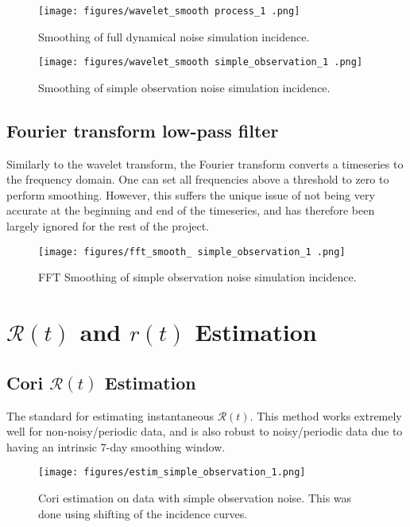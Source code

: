 \documentclass{article}
\newcommand{\nR}{\mathscr{R}}
\begin{document}
\clearpage
\begin{figure}[h!]
    \centering
    \texttt{[image: figures/wavelet\_smooth process\_1 .png]}
    \caption{Smoothing of full dynamical noise simulation incidence.}
\end{figure}

\clearpage
\begin{figure}[h!]
    \centering
    \texttt{[image: figures/wavelet\_smooth simple\_observation\_1 .png]}
    \caption{Smoothing of simple observation noise simulation incidence.}
\end{figure}



\subsection{Fourier transform low-pass filter}
Similarly to the wavelet transform, the Fourier transform converts a timeseries to the frequency domain. One can set all frequencies above a threshold to zero to perform smoothing. However, this suffers the unique issue of not being very accurate at the beginning and end of the timeseries, and has therefore been largely ignored for the rest of the project.

\clearpage
\begin{figure}[h!]
    \centering
    \texttt{[image: figures/fft\_smooth\_ simple\_observation\_1 .png]}
    \caption{FFT Smoothing of simple observation noise simulation incidence.}
\end{figure}

\section {$\nR(t)$ and $r(t)$ Estimation}
\subsection{Cori $\nR(t)$ Estimation}
The standard for estimating instantaneous $\nR(t)$. This method works extremely well for non-noisy/periodic data, and is also robust to noisy/periodic data due to having an intrinsic 7-day smoothing window. 

\clearpage
\begin{figure}[h!]
    \centering
    \texttt{[image: figures/estim\_simple\_observation\_1.png]}
    \caption{Cori estimation on data with simple observation noise. This was done using shifting of the incidence curves.}
\end{figure}
\end{document}

